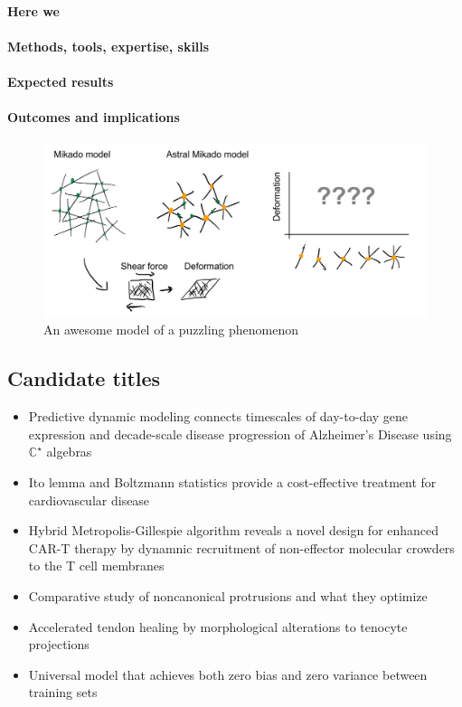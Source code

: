 \documentclass[onecolumn,11pt]{article}
\begin{document}
\paragraph{Here we}\lipsum[2]
\paragraph{Methods, tools, expertise, skills}\lipsum[2]
\paragraph{Expected results}\lipsum[2]
\paragraph{Outcomes and implications}\lipsum[2]


\begin{figure}[h!]
\centering
\includegraphics[width=4.5in]{figures/figJeanJacket.pdf}
\caption{\label{fig:JeanJacketSchematic}An awesome model of a puzzling phenomenon}
\end{figure}

\subsection*{Candidate titles}
 
\begin{itemize}
\item Predictive dynamic modeling connects timescales of day-to-day gene expression and decade-scale disease progression of Alzheimer's Disease using $\mathbb{C}^\star$ algebras
\item Ito lemma and Boltzmann statistics provide a cost-effective treatment for cardiovascular disease
\item Hybrid Metropolis-Gillespie algorithm reveals a novel design for enhanced CAR-T therapy by dynamnic recruitment of non-effector molecular crowders to the T cell membranes
\item Comparative study of noncanonical protrusions and what they optimize
\item Accelerated tendon healing by morphological alterations to tenocyte projections
\item Universal model that achieves both zero bias and zero variance between training sets
\end{itemize}
\end{document}
